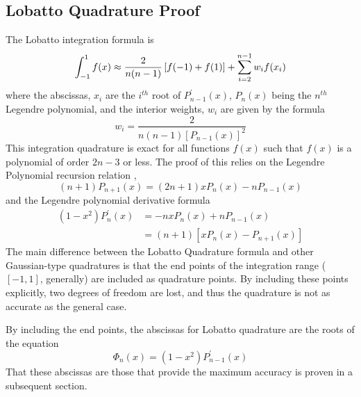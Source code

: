 \subsection{Lobatto Quadrature Proof}
\label{lobattoproof}
The Lobatto integration formula is 
\begin{equation}
\label{lobatint_proof}
\int_{-1}^{1} f(x) \approx \frac{2}{n(n-1)}\left[f(-1)+f(1)\right]+\sum_{i=2}^{n-1}w_if(x_i)
\end{equation}
where the abscissas, $x_i$ are the $i^{th}$ root of $P_{n-1}^\prime(x)$, $P_n(x)$ being the 
$n^{th}$ Legendre polynomial, and the interior weights, $w_i$ are given by the formula
\begin{equation}
\label{weightform}
w_i=\frac{2}{n(n-1)[P_{n-1}(x)]^2}
\end{equation}
This integration quadrature is exact for all functions $f(x)$ such that $f(x)$ is a
polynomial of order $2n-3$ or less. The proof of this relies on the Legendre Polynomial
recursion relation \cite{LegendrePoly},
\begin{equation}
\label{P3term}
(n+1)P_{n+1}(x)=(2n+1)xP_n(x)-nP_{n-1}(x) 
\end{equation}
and the Legendre polynomial derivative formula \cite{LegendrePoly}
\begin{align}
\label{P3der}
(1-x^2)P^\prime_{n}(x) &= -nxP_n(x)+nP_{n-1}(x) \\
  {}  &=(n+1)\left[xP_n(x)-P_{n+1}(x)\right]
\end{align}
The main difference between the Lobatto Quadrature formula and other Gaussian-type
quadratures is that the end points of the integration range ($[-1,1]$, generally) are
included as quadrature points. By including these points explicitly, two degrees 
of freedom are lost, and thus the quadrature is not as accurate as the general case. 

By including the end points, the abscissas for Lobatto quadrature are the roots
of the equation
\begin{equation}
\label{Phidef1}
\Phi_n(x)=(1-x^2)P_{n-1}^\prime(x)
\end{equation}
That these abscissas are those that provide the maximum accuracy is proven 
in a subsequent section. 

